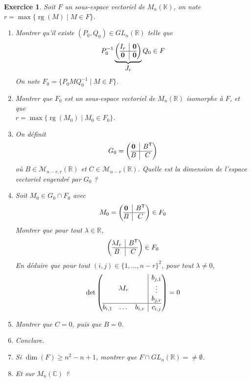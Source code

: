\documentclass[12pt]{article}
\newtheorem{exercise}{Exercice}[section]
\theoremstyle{remark}
\theoremstyle{remark}
\newcommand{\K}{\mathbb{K}}
\newcommand{\R}{\mathbb{R}}
\newcommand{\C}{\mathbb{C}}
\newcommand{\M}{\mathcal{M}}
\DeclareMathOperator{\rg}{rg}
\newcommand{\bigzero}{\mbox{\normalfont\bfseries 0}}
\begin{document}
\begin{exercise}
	Soit $F$ un sous-espace vectoriel de $M_{n}(\K)$, on note
	$r=\max\{\rg(M)\mid M\in F \}$.
	\begin{enumerate}
		\item Montrer qu'il existe $(P_{0},Q_{0})\in GL_{n}(\R)$ telle que 
		$$
		P_{0}^{-1}
		\underbrace{
			\left(
				\begin{array}{@{}c|c@{}}
					I_{r}
					& \bigzero \\
					\hline
					\bigzero &
					\bigzero
				\end{array}\right)
		}_{\displaystyle J_{r}}
		Q_{0}\in F
		$$
		On note $F_{0}=\{P_{0}MQ_{0}^{-1}\mid M\in F\}$.
		\item Montrer que $F_{0}$ est un sous-espace vectoriel de $M_{n}(\R)$
		isomorphe à $F$, et que \\$r=\max\{\rg(M_{0})\mid M_{0}\in F_{0}\}$.
		\item On définit 
		$$G_{0}=
		\left(
				\begin{array}{@{}c|c@{}}
					\bigzero
					& B^{\mathsf{T}} \\
					\hline
					B &
					C
				\end{array}\right)
		$$
		où $B\in\M_{n-r,r}(\R)$ et $C\in\M_{n-r}(\R)$. Quelle est la dimension de l'espace vectoriel engendré par $G_{0}$ ?
		\item Soit $M_{0}\in G_{0}\cap F_{0}$ avec 
		$$
			M_{0}=
			\left(
				\begin{array}{@{}c|c@{}}
					\bigzero
					& B^{\mathsf{T}} \\
					\hline
					B &
					C
				\end{array}
			\right)
			\in F_{0}
		$$
		Montrer que pour tout $\lambda\in\R$,
		$$
			\left(
				\begin{array}{@{}c|c@{}}
					\lambda I_{r}
					& B^{\mathsf{T}} \\
					\hline
					B &
					C
				\end{array}
			\right)
			\in F_{0}
		$$
		En déduire que pour tout $(i,j)\in\{1,\dots, n-r\}^{2}$, pour tout $\lambda\neq0$,
		$$
		\det\left(
				\begin{array}{@{}c|c@{}}
					\lambda I_{r}
					& \begin{matrix}
						b_{j,1}\\
						\vdots\\
						b_{j,r}
					\end{matrix} \\
					\hline
					\begin{matrix}
						b_{i,1} & \dots & b_{i,r}
					\end{matrix} &
					c_{i,j}
				\end{array}
			\right)=0
		$$
		\item Montrer que $C=0$, puis que $B=0$.
		\item Conclure.
		\item Si $\dim(F)\geqslant n^{2}-n+1$, montrer que $F\cap GL_{n}(\R)=\neq\emptyset$.
		\item Et sur $M_{n}(\C)$ ?
	\end{enumerate}
\end{exercise}
\end{document}
